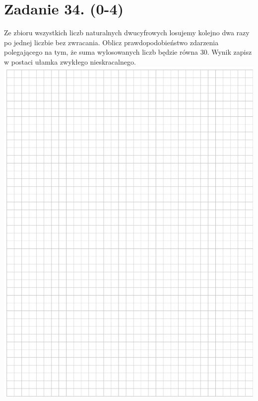 \documentclass[10pt]{article}
\begin{document}
\section*{Zadanie 34. (0-4)}
Ze zbioru wszystkich liczb naturalnych dwucyfrowych losujemy kolejno dwa razy po jednej liczbie bez zwracania. Oblicz prawdopodobieństwo zdarzenia polegającego na tym, że suma wylosowanych liczb będzie równa 30. Wynik zapisz w postaci ułamka zwykłego nieskracalnego.\\
\includegraphics[max width=\textwidth, center]{2024_11_21_1c92fcc0db78c9202015g-22}\\
\end{document}
